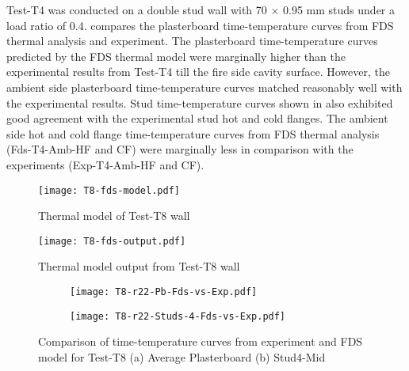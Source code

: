 Test-T4 was conducted on a double stud wall with 70 $\times$ 0.95 mm studs under a load ratio of 0.4.  compares the plasterboard time-temperature curves from FDS thermal analysis and experiment. The plasterboard time-temperature curves predicted by the FDS thermal model were marginally higher than the experimental results from Test-T4 till the fire side cavity surface. However, the ambient side plasterboard time-temperature curves matched reasonably well with the experimental results. Stud time-temperature curves shown in  also exhibited good agreement with the experimental stud hot and cold flanges. The ambient side hot and cold flange time-temperature curves from FDS thermal analysis (Fds-T4-Amb-HF and CF) were marginally less in comparison with the experiments (Exp-T4-Amb-HF and CF).
\begin{figure}[htbp]
	\centering
		\texttt{[image: T8-fds-model.pdf]}
		\caption{Thermal model of Test-T8 wall}
		\label{fig:T8-fds-model}
\end{figure}
\begin{figure}[htbp]
	\centering
		\texttt{[image: T8-fds-output.pdf]}
		\caption{Thermal model output from Test-T8 wall}
		\label{fig:T8-fds-output}
\end{figure}
\begin{figure}[!htbp]
	\centering
	\begin{subfigure}[b]{0.7\textwidth}
		\centering
		\texttt{[image: T8-r22-Pb-Fds-vs-Exp.pdf]}
		\caption{}
		\label{subfig:T8-r22-Pb-Fds-vs-Exp}
	\end{subfigure}
	\begin{subfigure}[b]{0.6\textwidth}
		\centering
		\texttt{[image: T8-r22-Studs-4-Fds-vs-Exp.pdf]}
		\caption{}
		\label{subfig:T8-r22-Studs-4-Fds-vs-Exp}
	\end{subfigure}
	   \caption{Comparison of time-temperature curves from experiment and FDS model for Test-T8 (a) Average Plasterboard (b) Stud4-Mid}
	   \label{fig:fds-output-pb-studs-t8}
\end{figure}

